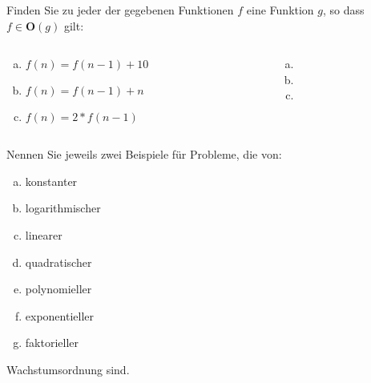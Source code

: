\begin{card}
	Finden Sie zu jeder der gegebenen Funktionen $f$ eine Funktion $g$, so dass $f \in \mathbf{O}(g)$ gilt:
	\begin{columns}
		\begin{column}{.5\linewidth}
			\begin{enumerate}[a)]
			\item $f(n) =f(n - 1 ) + 10$
			\item $f(n) =f(n- 1 ) +n$
			\item $f(n) = 2*f(n- 1 )$
			\end{enumerate}
		\end{column}
		\begin{column}{.5\linewidth}
			\begin{enumerate}[a)]
			\item 
			\item 
			\item 
			\end{enumerate}
		\end{column}
	\end{columns}
\end{card}

\begin{card}
	Nennen Sie jeweils zwei Beispiele für Probleme, die von:
	\begin{enumerate}[a)]
	\item konstanter
	\item logarithmischer
	\item linearer
	\item quadratischer
	\item polynomieller
	\item exponentieller
	\item faktorieller 
	\end{enumerate}
	Wachstumsordnung sind.
	\hr
\end{card}

